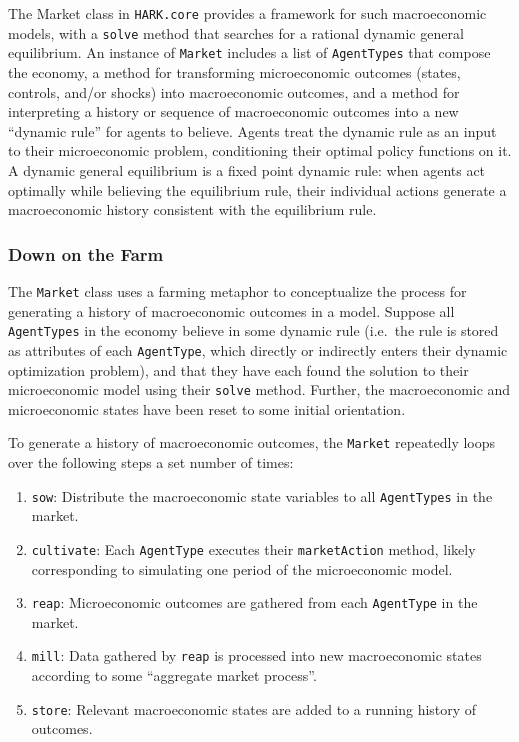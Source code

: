 \message{ !name(ccarroll_et_al_scipy_2018.tex)}\documentclass[10pt,twocolumn]{article}
\providecommand{\tightlist}{%
  \setlength{\itemsep}{0pt}\setlength{\parskip}{0pt}}
\begin{document}
The Market class in \texttt{HARK.core} provides a framework for such
macroeconomic models, with a \texttt{solve} method that searches for a
rational dynamic general equilibrium. An instance of \texttt{Market}
includes a list of \texttt{AgentTypes} that compose the economy, a
method for transforming microeconomic outcomes (states, controls, and/or
shocks) into macroeconomic outcomes, and a method for interpreting a
history or sequence of macroeconomic outcomes into a new ``dynamic
rule'' for agents to believe. Agents treat the dynamic rule as an input
to their microeconomic problem, conditioning their optimal policy
functions on it. A dynamic general equilibrium is a fixed point dynamic
rule: when agents act optimally while believing the equilibrium rule,
their individual actions generate a macroeconomic history consistent
with the equilibrium rule.

\subsubsection{Down on the Farm}\label{down-on-the-farm}

The \texttt{Market} class uses a farming metaphor to conceptualize the
process for generating a history of macroeconomic outcomes in a model.
Suppose all \texttt{AgentTypes} in the economy believe in some dynamic
rule (i.e.~the rule is stored as attributes of each \texttt{AgentType},
which directly or indirectly enters their dynamic optimization problem),
and that they have each found the solution to their microeconomic model
using their \texttt{solve} method. Further, the macroeconomic and
microeconomic states have been reset to some initial orientation.

To generate a history of macroeconomic outcomes, the \texttt{Market}
repeatedly loops over the following steps a set number of times:

\begin{enumerate}
\def\labelenumi{\arabic{enumi}.}
\tightlist
\item
  \texttt{sow}: Distribute the macroeconomic state variables to all
  \texttt{AgentTypes} in the market.
\item
  \texttt{cultivate}: Each \texttt{AgentType} executes their
  \texttt{marketAction} method, likely corresponding to simulating one
  period of the microeconomic model.
\item
  \texttt{reap}: Microeconomic outcomes are gathered from each
  \texttt{AgentType} in the market.
\item
  \texttt{mill}: Data gathered by \texttt{reap} is processed into new
  macroeconomic states according to some ``aggregate market process''.
\item
  \texttt{store}: Relevant macroeconomic states are added to a running
  history of outcomes.
\end{enumerate}
\end{document}
